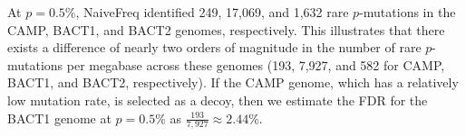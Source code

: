 At $p=0.5$\%, NaiveFreq identified 249, 17,069, and 1,632 rare $p$-mutations in the CAMP, BACT1, and BACT2 genomes, respectively. This illustrates that there exists a difference of nearly two orders of magnitude in the number of rare $p$-mutations per megabase across these genomes (193, 7,927, and 582 for CAMP, BACT1, and BACT2, respectively). If the CAMP genome, which has a relatively low mutation rate, is selected as a decoy, then we estimate the FDR for the BACT1 genome at $p=0.5\%$ as $\frac{193}{7,927} \approx 2.44\%$.\endinput
